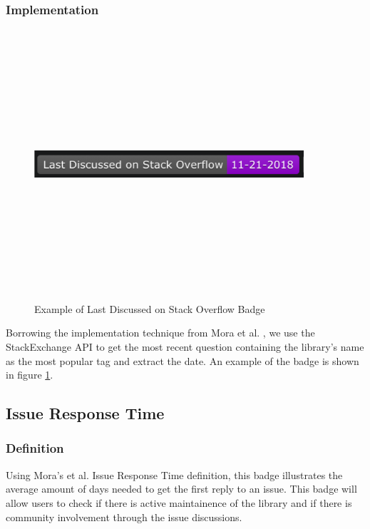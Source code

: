 \documentclass[12pt, letterpaper]{article}
\begin{document}
\subsubsection{Implementation}

\begin{figure}[!htb]
    \centerline{
        \includegraphics[width=10cm,height=10cm,keepaspectratio=true]{lastdiscussedbadge}
    }
    \caption{
        Example of Last Discussed on Stack Overflow Badge
    }
    \label{lastdiscussed}
\end{figure}

Borrowing the implementation technique from Mora et al. \cite{metrics}, we use the StackExchange API \cite{stackexchangeapi}
to get the most recent question containing the library's name as the most popular tag
and extract the date. An example of the badge is shown in figure \ref{lastdiscussed}.

\subsection{Issue Response Time}
\subsubsection{Definition}
Using Mora's et al. \cite{metrics} Issue Response Time definition, this badge illustrates the average
amount of days needed to get the first reply to an issue. 
This badge will allow users to check if there is active maintainence of the library and if there is community 
involvement
through the issue discussions. 
\end{document}

